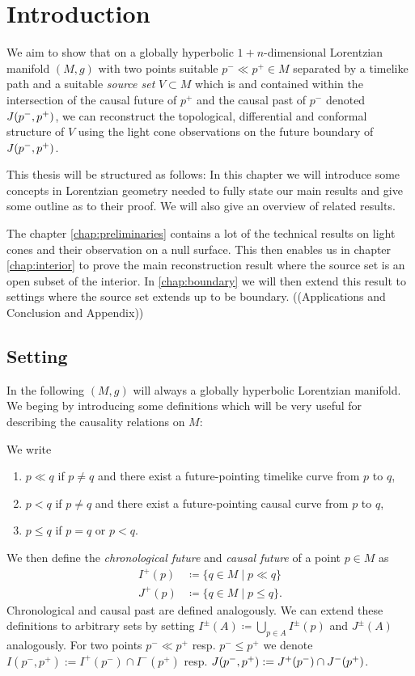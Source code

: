\chapter{Introduction}

We aim to show that on a globally hyperbolic $1+n$-dimensional Lorentzian manifold $(M,g)$ with two points suitable $p^-\ll p^+\in M$ separated by a timelike path and a suitable \emph{source set} $V\subset M$ which is and contained within the intersection of the causal future of $p^+$ and the causal past of $p^-$ denoted $J(p^-,p^+)$, we can reconstruct the topological, differential and conformal structure of $V$ using the light cone observations on the future boundary of $J(p^-,p^+)$. 

This thesis will be structured as follows: In this chapter we will introduce some concepts in Lorentzian geometry needed to fully state our main results and give some outline as to their proof. We will also give an overview of related results.

The chapter \ref{chap:preliminaries} contains a lot of the technical results on light cones and their observation on a null surface. This then enables us in chapter \ref{chap:interior} to prove the main reconstruction result where the source set is an open subset of the interior. In \ref{chap:boundary} we will then extend this result to settings where the source set extends up to be boundary.
((Applications and Conclusion and Appendix))

\section{Setting}
In the following $(M,g)$ will always a globally hyperbolic Lorentzian manifold. We beging by introducing some definitions which will be very useful for describing the causality relations on $M$:
\begin{definition}\label{def:causalrelations}
    We write
    \begin{enumerate}
        \item $p\ll q$ if $p\neq q$ and there exist a future-pointing timelike curve from $p$ to $q$,
        \item $p<q$ if $p\neq q$ and there exist a future-pointing causal curve from $p$ to $q$,
        \item $p\leq q$ if $p=q$ or $p<q$.
    \end{enumerate}
    We then define the \emph{chronological future} and \emph{causal future} of a point $p\in M$ as
    \begin{align*}
        I^+(p) &\coloneqq \{q\in M \mid p\ll q\}\\
        J^+(p) &\coloneqq \{q\in M \mid p\leq q\}.
    \end{align*} Chronological and causal past are defined analogously.
    We can extend these definitions to arbitrary sets by setting $I^\pm(A)\coloneqq\bigcup_{p\in A}I^\pm(p)$ and $J^\pm(A)$ analogously. For two points $p^-\ll p^+$ resp. $p^-\leq p^+$ we denote $I(p^-,p^+):=I^+(p^-)\cap I^-(p^+)$ resp. $J(p^-,p^+):=J^+(p^-)\cap J^-(p^+)$.
\end{definition}

